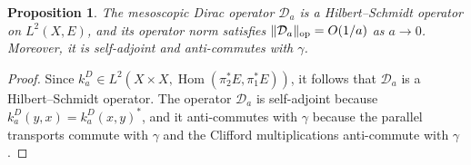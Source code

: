\documentclass[a4paper,oneside,12pt]{amsart}
\theoremstyle{plain}
\newtheorem{proposition}[theorem]{Proposition}
\theoremstyle{definition}
\theoremstyle{remark}
\DeclareMathOperator{\Hom}{Hom}
\DeclarePairedDelimiter{\operatornorm}{\lVert}{\rVert_{\mathrm{op}}}
\newcommand{\mesoscopicDiracoperator}[1][a]{\mathcal{D}_{#1}}
\newcommand{\integralkernel}{k}
\newcommand{\kernelDirac}{\integralkernel_a^D}
\begin{document}
\begin{proposition}\label{proposition: mesoscopic Dirac is hilbert--schmidt and selfadjoint}
  The mesoscopic Dirac operator $\mesoscopicDiracoperator$ is a Hilbert--Schmidt operator on $L^2(X,E)$, and its operator norm satisfies $\operatornorm{\mesoscopicDiracoperator} = O(1/a)$ as $a \to 0$.
  Moreover, it is self-adjoint and anti-commutes with $\gamma$.
\end{proposition}
\begin{proof}
  Since $\kernelDirac \in L^2(X \times X, \Hom(\pi_2^* E, \pi_1^* E))$, it follows that $\mesoscopicDiracoperator$ is a Hilbert--Schmidt operator.
  The operator $\mesoscopicDiracoperator$ is self-adjoint because $\kernelDirac(y,x) = \kernelDirac(x,y)^*$, and it anti-commutes with $\gamma$ because the parallel transports commute with $\gamma$ and the Clifford multiplications anti-commute with $\gamma$.


\end{proof}
\end{document}
